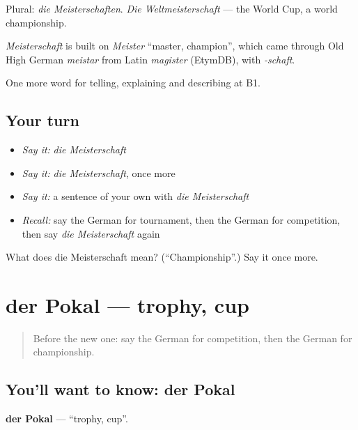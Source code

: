 Plural: \emph{die Meisterschaften}. \emph{Die Weltmeisterschaft} — the World Cup, a world championship.

\begin{cousinweb}
\emph{Meisterschaft} is built on \emph{Meister} \textquotedblleft{}master, champion\textquotedblright{}, which came through Old High German \emph{meistar} from Latin \emph{magister} (EtymDB), with \emph{-schaft}.
\end{cousinweb}

\begin{grammarlens}[title={What you've built}]
One more word for telling, explaining and describing at B1.
\end{grammarlens}

\subsection*{Your turn}
\begin{itemize}
\raggedright
  \item \emph{Say it:} \emph{die Meisterschaft}
  \item \emph{Say it:} \emph{die Meisterschaft}, once more
  \item \emph{Say it:} a sentence of your own with \emph{die Meisterschaft}
  \item \emph{Recall:} say the German for tournament, then the German for competition, then say \emph{die Meisterschaft} again
\end{itemize}

\begin{tcolorbox}[breakable,colback=teal!4,colframe=teal!35!black,title={Before you move on}]
What does die Meisterschaft mean? (\textquotedblleft{}Championship\textquotedblright{}.) Say it once more.
\end{tcolorbox}
\section[der Pokal]{der Pokal — trophy, cup}

\label{lesson:GE-C509-pokal}



\begin{quote}
Before the new one: say the German for competition, then the German for championship.
\end{quote}

\subsection*{You'll want to know: der Pokal}
\textbf{der Pokal} — \textquotedblleft{}trophy, cup\textquotedblright{}.

